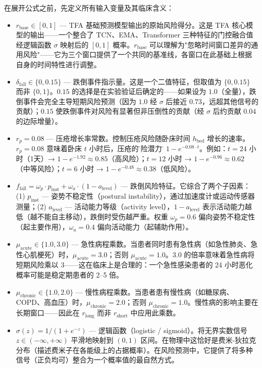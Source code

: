 \documentclass[11pt,a4paper]{ctexart}
\theoremstyle{remark}
\begin{document}
在展开公式之前，先定义所有输入变量及其临床含义：
\begin{itemize}[nosep]
\item $r_{\text{base}} \in [0,1]$ — TFA 基础预测模型输出的原始风险得分。这是 TFA 核心模型的输出——一个整合了 TCN、EMA、Transformer 三种特征的门控融合值经逻辑函数 $\sigma$ 映射后的 $[0,1]$ 概率。$r_{\text{base}}$ 可以理解为"忽略时间窗口差异的通用风险"——它为三个窗口提供了一个共同的基准线，各窗口在此基础上根据自身的时间特性进行调整。
\item $\delta_{\text{fall}} \in \{0, 0.15\}$ — 跌倒事件指示量。这是一个二值特征，但取值为 $\{0, 0.15\}$ 而非 $\{0, 1\}$。$0.15$ 的选择是在实验验证后确定的——如果设为 $1.0$（全量），跌倒事件会完全主导短期风险预测（因为 $1.0$ 经 $\sigma$ 后接近 $0.73$，远超其他信号的贡献）；$0.15$ 使跌倒事件对风险有显著但非压倒性的贡献（经 $\sigma$ 后约贡献 $0.04$ 的边际增量）。
\item $r_p = 0.08$ — 压疮增长率常数。控制压疮风险随卧床时间 $h_{\text{bed}}$ 增长的速率。$r_p = 0.08$ 意味着卧床 $t$ 小时后，压疮的\"风险潜力\"为 $1 - e^{-0.08 \cdot t}$。例如：$t=24$ 小时（1天）→ $1-e^{-1.92} \approx 0.85$（高风险）；$t=12$ 小时 → $1-e^{-0.96} \approx 0.62$（中等风险）；$t=6$ 小时 → $1-e^{-0.48} \approx 0.38$（低风险）。
\item $f_{\text{fall}} = \omega_p \cdot p_{\text{inst}} + \omega_a \cdot (1 - a_{\text{level}})$ — 跌倒风险特征。它综合了两个子因素：(1) $p_{\text{inst}}$ — 姿势不稳定性（postural instability），通过加速度计或运动传感器测量；(2) $a_{\text{level}}$ — 活动能力等级（activity level），$1 - a_{\text{level}}$ 表示活动能力越低（越不能自主移动），跌倒时受伤越严重。权重 $\omega_p = 0.6$ 偏向姿势不稳定性（起主要作用），$\omega_a = 0.4$ 偏向活动能力（起辅助作用）。
\item $\mu_{\text{acute}} \in \{1.0, 3.0\}$ — 急性病程乘数。当患者同时患有急性病（如急性肺炎、急性心肌梗死）时，$\mu_{\text{acute}} = 3.0$；否则 $\mu_{\text{acute}} = 1.0$。$3.0$ 的倍率意味着急性病将短期风险乘以 3——这在临床上是合理的：一个急性感染患者的 24 小时恶化概率可能是稳定期患者的 2--5 倍。
\item $\mu_{\text{chronic}} \in \{1.0, 2.0\}$ — 慢性病程乘数。当患者患有慢性病（如糖尿病、COPD、高血压）时，$\mu_{\text{chronic}} = 2.0$；否则 $\mu_{\text{chronic}} = 1.0$。慢性病的影响主要在长期窗口——因此在 $r_{\text{long}}$ 而非 $r_{\text{short}}$ 中应用此乘数。
\item $\sigma(z) = 1/(1+e^{-z})$ — 逻辑函数（logistic / sigmoid）。将无界实数信号 $z \in (-\infty, +\infty)$ 平滑地映射到 $(0, 1)$ 区间。在物理中这恰好是费米-狄拉克分布（描述费米子在各能级上的占据概率）。在风险预测中，它提供了将多种信号（正负均可）整合为一个概率值的最自然方式。
\end{itemize}
\end{document}
